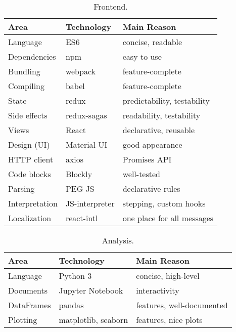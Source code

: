 \begin{table}[htb]
\centering
\caption{Frontend.}
\begin{tabular}{l l l}
\toprule
Area & Technology & Main Reason  \\
\midrule
Language & ES6 & concise, readable \\
Dependencies & npm & easy to use \\
Bundling & webpack & feature-complete \\ %
Compiling & babel & feature-complete \\ %
State & redux  & predictability, testability \\  %
Side effects & redux-sagas  & readability, testability \\
Views & React & declarative, reusable \\
Design (UI) & Material-UI & good appearance \\
HTTP client & axios & Promises API\\
Code blocks & Blockly & well-tested \\
Parsing & PEG JS & declarative rules \\  %
Interpretation & JS-interpreter & stepping, custom hooks \\
Localization & react-intl & one place for all messages \\
\bottomrule
\end{tabular}
\end{table}

\begin{table}[htb]
\centering
\caption{Analysis.}
\begin{tabular}{l l l}
\toprule
Area & Technology & Main Reason  \\
\midrule
Language & Python 3 & concise, high-level \\
Documents & Jupyter Notebook & interactivity \\
DataFrames & pandas & features, well-documented \\
Plotting & matplotlib, seaborn & features, nice plots \\
\bottomrule
\end{tabular}
\end{table}
